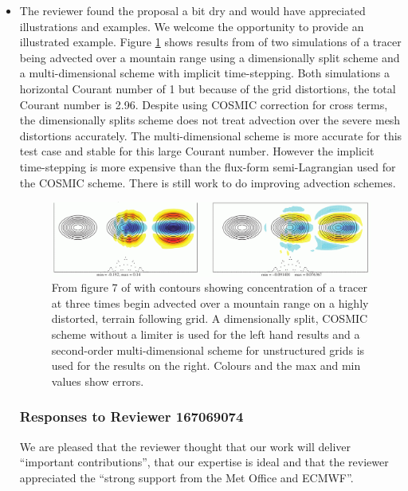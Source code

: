 \begin{itemize}
\item
The reviewer found the proposal a bit dry and would have appreciated illustrations and examples. We welcome the opportunity to provide an illustrated example. Figure \ref{fig:CWPS17_fig7} shows results from \cite{CWPS17} of two simulations of a tracer being advected over a mountain range using a dimensionally split scheme and a multi-dimensional scheme with implicit time-stepping. Both simulations a horizontal Courant number of 1 but because of the grid distortions, the total Courant number is 2.96. Despite using COSMIC correction for cross terms, the dimensionally splits scheme does not treat advection over the severe mesh distortions accurately. The multi-dimensional scheme is more accurate for this test case and stable for this large Courant number. However the implicit time-stepping is more expensive than the flux-form semi-Lagrangian used for the COSMIC scheme. There is still work to do improving advection schemes.

\begin{figure}
\includegraphics[width=\linewidth]{ChenFig7.png}
\caption{From figure 7 of \cite{CWPS17} with contours showing concentration of a tracer at three times begin advected over a mountain range on a highly distorted, terrain following grid. A dimensionally split, COSMIC scheme without a limiter is used for the left hand results and a second-order multi-dimensional scheme for unstructured grids is used for the results on the right. Colours and the max and min values show errors.}
\label{fig:CWPS17_fig7}
\end{figure}


\subsubsection*{Responses to Reviewer 167069074}

We are pleased that the reviewer thought that our work will deliver ``important contributions'', that our expertise is ideal and that the reviewer appreciated the ``strong support from the Met Office and ECMWF''. 


\end{itemize}
